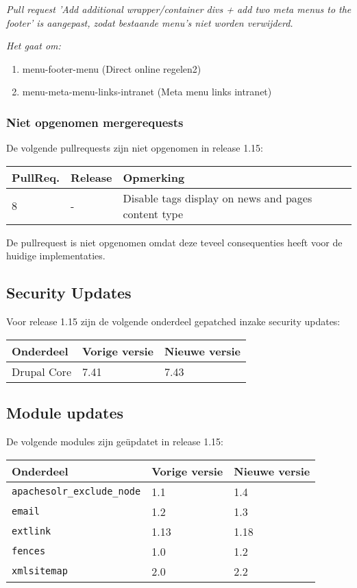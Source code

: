 \textit{Pull request 'Add additional wrapper/container divs + add two meta menus to the footer' is aangepast, zodat bestaande menu's niet worden verwijderd.
}

\textit{Het gaat om:}
\begin{enumerate}
\item menu-footer-menu (Direct online regelen2)
\item menu-meta-menu-links-intranet (Meta menu links intranet)
\end{enumerate}

\subsubsection{Niet opgenomen mergerequests}
De volgende pullrequests zijn niet opgenomen in release 1.15:

\begin{tabularx}{\linewidth}{l|l|X} \hline
PullReq. & Release & Opmerking \\ \hline
8 & - & Disable tags display on news and pages content type \\ \hline
\end{tabularx}

De pullrequest is niet opgenomen omdat deze teveel consequenties heeft voor de huidige implementaties.

\subsection{Security Updates}
Voor release 1.15 zijn de volgende onderdeel gepatched inzake security updates:

\begin{tabularx}{\linewidth}{X|l|l} \hline
Onderdeel & Vorige versie & Nieuwe versie \\ \hline
Drupal Core & 7.41 & 7.43 \\ \hline
\end{tabularx}

\subsection{Module updates}
De volgende modules zijn ge\"updatet in release 1.15:

\begin{tabularx}{\linewidth}{X|l|l} \hline
Onderdeel & Vorige versie & Nieuwe versie \\ \hline
\texttt{apachesolr\_exclude\_node} & 1.1 & 1.4 \\ \hline
\texttt{email} & 1.2 & 1.3 \\ \hline
\texttt{extlink} & 1.13 & 1.18 \\ \hline
\texttt{fences} & 1.0 & 1.2 \\ \hline
\texttt{xmlsitemap} & 2.0 & 2.2 \\ \hline
\end{tabularx}

